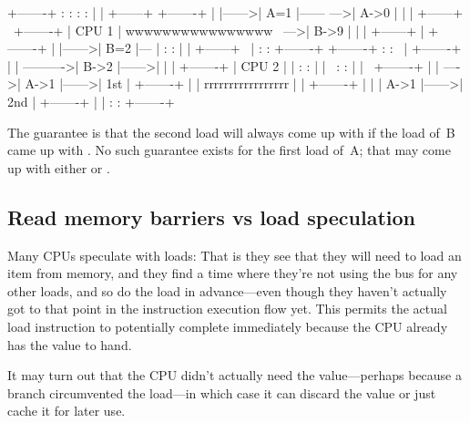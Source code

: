 \begin{VerbatimU}
	+-------+       :      :                :       :
	|       |       +------+                +-------+
	|       |------>| A=1  |------      --->| A->0  |
	|       |       +------+      \         +-------+
	| CPU 1 |   wwwwwwwwwwwwwwww   \    --->| B->9  |
	|       |       +------+        |       +-------+
	|       |------>| B=2  |---     |       :       :
	|       |       +------+   \    |       :       :       +-------+
	+-------+       :      :    \   |       +-------+       |       |
	                             ---------->| B->2  |------>|       |
	                                |       +-------+       | CPU 2 |
	                                |       :       :       |       |
	                                 \      :       :       |       |
	                                  \     +-------+       |       |
	                                   ---->| A->1  |------>| 1st   |
	                                        +-------+       |       |
	                                    rrrrrrrrrrrrrrrrr   |       |
	                                        +-------+       |       |
	                                        | A->1  |------>| 2nd   |
	                                        +-------+       |       |
	                                        :       :       +-------+
\end{VerbatimU}

The guarantee is that the second load will always come up with 
if the load of~B came up with .
No such guarantee exists for the first load of~A; that may come up with
either  or .


\subsection{Read memory barriers vs load speculation}

Many CPUs speculate with loads:
That is they see that they will need to load an item from memory, and
they find a time where they're not using the bus for any other loads,
and so do the load in advance---even though they haven't actually
got to that point in the instruction execution flow yet.
This permits the actual load instruction to potentially complete
immediately because the CPU already has the value to hand.

It may turn out that the CPU didn't actually need the value---perhaps
because a branch circumvented the load---in which case it can discard
the value or just cache it for later use.

